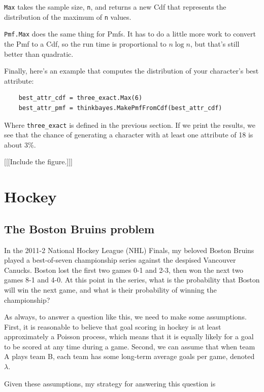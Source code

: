 \documentclass[12pt]{book}
\begin{document}
\verb"Max" takes the sample size, {\tt n}, and returns a new
Cdf that represents the distribution of the maximum of {\tt n}
values.

\verb"Pmf.Max" does the same thing for Pmfs.  It has to
do a little more work to convert the Pmf to a Cdf, so the
run time is proportional to $n \log n$, but that's still
better than quadratic.

Finally, here's an example that computes the distribution of
your character's best attribute:

\begin{verbatim}
    best_attr_cdf = three_exact.Max(6)
    best_attr_pmf = thinkbayes.MakePmfFromCdf(best_attr_cdf)
\end{verbatim}

Where \verb"three_exact" is defined in the previous section.
If we print the results, we see that the chance of generating
a character with at least one attribute of 18 is about 3\%.

[[[Include the figure.]]]


\chapter{Hockey}

\section{The Boston Bruins problem}

In the 2011-2 National Hockey League (NHL) Finals, my beloved Boston
Bruins played a best-of-seven championship series against the despised
Vancouver Canucks.  Boston lost the first two games 0-1 and 2-3, then
won the next two games 8-1 and 4-0.  At this point in the series, what
is the probability that Boston will win the next game, and what is
their probability of winning the championship?

As always, to answer a question like this, we need to make some
assumptions.  First, it is reasonable to believe that goal scoring in
hockey is at least approximately a Poisson process, which means that
it is equally likely for a goal to be scored at any time during a
game.  Second, we can assume that when team A plays team B, each team
has some long-term average goals per game, denoted $\lambda$.

Given these assumptions, my strategy for answering this question is
\end{document}
